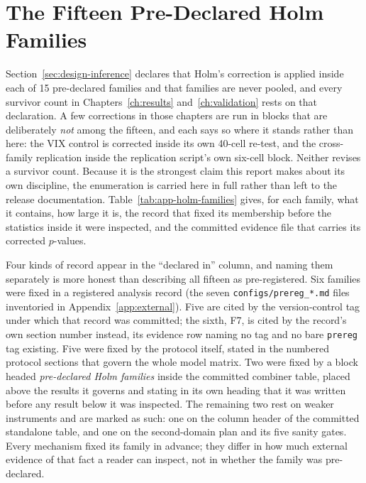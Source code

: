 \FloatBarrier
\section{The Fifteen Pre-Declared Holm Families}
\label{app:res-holmfams}

Section~\ref{sec:design-inference} declares that Holm's correction is
applied inside each of 15 pre-declared families and that families are
never pooled, and every survivor count in Chapters~\ref{ch:results}
and~\ref{ch:validation} rests on that declaration. A few corrections in those
chapters are run in blocks that are deliberately \emph{not} among the fifteen,
and each says so where it stands rather than here: the VIX control is corrected
inside its own 40-cell re-test, and the cross-family replication inside the
replication script's own six-cell block. Neither revises a survivor count.
Because it is the
strongest claim this report makes about its own discipline, the
enumeration is carried here in full rather than left to the release
documentation. Table~\ref{tab:app-holm-families} gives, for each family,
what it contains, how large it is, the record that fixed its membership
before the statistics inside it were inspected, and the committed
evidence file that carries its corrected $p$-values.

Four kinds of record appear in the ``declared in'' column, and naming
them separately is more honest than describing all fifteen as
pre-registered. Six families were fixed in a registered analysis record
(the seven \texttt{configs/prereg\_*.md} files inventoried in
Appendix~\ref{app:external}). Five are cited by the version-control tag under
which that record was committed; the sixth, F7, is cited by the record's own
section number instead, its evidence row naming no tag and no bare
\texttt{prereg} tag existing.
Five were fixed by the protocol itself,
stated in the numbered protocol sections that govern the whole model matrix. Two were fixed by a block
headed \emph{pre-declared Holm families} inside the committed combiner
table, placed above the results it governs and stating in its own heading
that it was written before any result below it was inspected. The
remaining two rest on weaker instruments and are marked as such: one on
the column header of the committed standalone table, and one on the
second-domain plan and its five sanity gates. %
Every mechanism fixed its family in advance; they differ in how much
external evidence of that fact a reader can inspect, not in whether the
family was pre-declared.


